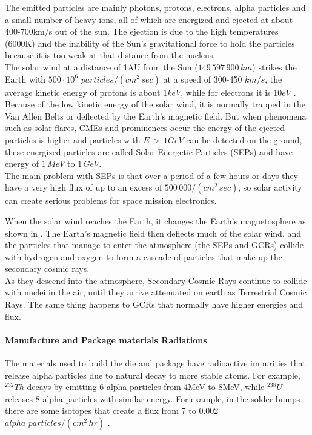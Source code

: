 {{{{{					The emitted particles are mainly photons, protons, electrons, alpha particles and a small number of heavy ions, all of which are energized and ejected at about 400-700km/s out of the sun. The ejection is due to the high temperatures (6000K) and the inability of the Sun's gravitational force to hold the particles because it is too weak at that distance from the nucleus. \\
					
					The solar wind at a distance of 1AU from the Sun  ($149\,597\,900\,km$) strikes the Earth with $500\cdot 10^6\,\, particles/(cm^2\,sec)$ at a speed of 300-450$\,\,km/s$, the average kinetic energy of protons is about $1keV$, while for electrons it is $10eV$ . Because of the low kinetic energy of the solar wind, it is normally trapped in the Van Allen Belts or deflected by the Earth's magnetic field. But when phenomena such as solar flares, CMEs and prominences occur the energy of the ejected particles is higher and particles with $E\,>\,1GeV$ can be detected on the ground, these energized particles are called Solar Energetic Particles (SEPs) and have energy of $1\,MeV$ to $1\,GeV$.\\
					
					The main problem with SEPs is that over a period of a few hours or days they have a very high flux of up to an excess of $500\,000/(cm^2\,sec)$, so solar activity can create serious problems for space mission electronics.
		
					When the solar wind reaches the Earth, it changes the Earth's magnetosphere as shown in . The Earth's magnetic field then deflects much of the solar wind, and the particles that manage to enter the atmosphere (the SEPs and GCRs) collide with hydrogen and oxygen to form a cascade of particles that make up the secondary cosmic rays. \\
					
					As they descend into the atmosphere, Secondary Cosmic Rays continue to collide with nuclei in the air, until they arrive attenuated on earth as Terrestrial Cosmic Rays. The same thing happens to GCRs that normally have higher energies and flux.
				}%
			
				\paragraph{Manufacture and Package materials Radiations}{
					The materials used to build the die and package have radioactive impurities that release alpha particles due to natural decay to more stable atoms. For example, $^{232}Th$ decays by emitting 6 alpha particles from 4MeV to 8MeV, while $^{238}U$ releases 8 alpha particles with similar energy. For example, in the solder bumps there are some isotopes that create a flux from 7 to 0.002 $alpha\,\,particles/(cm^2\,hr)$ .\\ 
					
}}}}}
